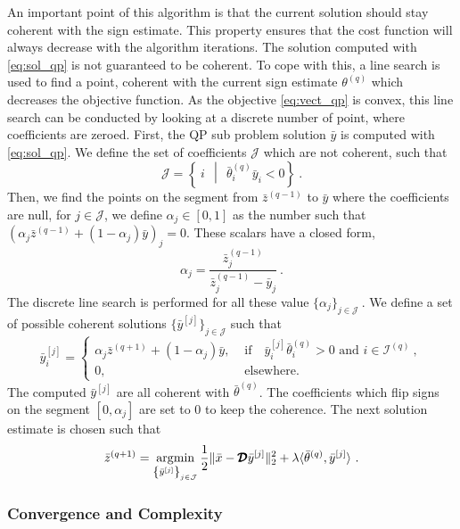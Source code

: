 \documentclass[../thesis.tex]{subfiles}
\begin{document}
	An important point of this algorithm is that the current solution should stay
	coherent with the sign estimate. This property ensures that the cost function
	will always decrease with the algorithm iterations. The solution computed with
	\autoref{eq:sol_qp} is not guaranteed to be coherent. To cope with this, a line
	search is used to find a point, coherent with the current sign estimate
	$\theta^{(q)}$ which decreases the objective function. As the objective
	\autoref{eq:vect_qp} is convex, this line search can be conducted by looking at
	a discrete number of point, where coefficients are zeroed. First, the QP sub
	problem solution $\bar y$ is computed with \autoref{eq:sol_qp}. We define the
	set of coefficients $\mathcal J$ which are not coherent, such that
	\[
		\mathcal J = \left \{ ~i ~~\middle |~~ \bar\theta^{(q)}_i \bar y_i < 0 \right \}~.
	\]
	Then, we find the points on the segment from $\bar z^{(q-1)}$ to $\bar y$ where
	the coefficients are null, \ie{} for $j \in \mathcal J$, we define
	$\alpha_j \in [0, 1]$ as the number such that
	$\left(\alpha_j \bar z^{(q-1)} + (1-\alpha_j) \bar y\right)_j = 0$. These scalars
	have a closed form,
	\[
		\alpha_j = \frac{\bar z^{(q-1)}_j}{\bar z^{(q-1)}_j - \bar y_j}~.
	\]
	The discrete line search is performed for all these value
	$\{ \alpha_j \}_{j\in \mathcal J}~.$ We define a set of possible
	coherent solutions $ \{ \bar y^{[j]} \}_{j\in \mathcal J} $ such that
	\[
		\bar y^{[j]}_i = \begin{cases}
			\alpha_j \bar z^{(q+1)} + (1-\alpha_j) \bar y, &
				\text{ if } ~~~\bar y^{[j]}_i\bar\theta^{(q)}_i > 0 \text{ and } i \in \mathcal I^{(q)}~,\\
			0, &\text{ elsewhere.}
		\end{cases}
	\]
	The computed $\bar y^{[j]}$ are all coherent with $\bar\theta^{(q)}$. The coefficients
	which flip signs on the segment $[0, \alpha_j]$ are set to 0 to keep the coherence.
	The next solution estimate is chosen such that
	\[
		\bar z^{(q+1)} = \operatorname*{\arg\!\min}_{\left \{ \bar y^{[j]} \right \}_{j \in \mathcal J}}
					\frac{1}{2}\|\bar x - \pmb{\mathcal D} \bar y^{[j]} \|_2^2
						+ \lambda \langle\bar\theta^{(q)}, \bar y^{[j]}\rangle~.
	\]


\subsubsection{Convergence and Complexity}
\label{par:cvg_fss} 
\end{document}

